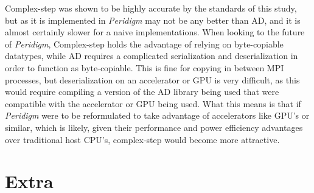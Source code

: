 \documentclass[preprint,12pt]{elsarticle}
\begin{document}
Complex-step was shown to be highly accurate by the standards of this study, but as it is
implemented in \emph{Peridigm} may not be any better than AD, and it is almost certainly slower for
a naive implementations. When looking to the future of \emph{Peridigm}, Complex-step holds the
advantage of relying on byte-copiable datatypes, while AD requires a complicated serialization and
deserialization in order to function as byte-copiable. This is fine for copying in between MPI
processes, but deserialization on an accelerator or GPU is very difficult, as this would require
compiling a version of the AD library being used that were compatible with the accelerator or GPU
being used. What this means is that if \emph{Peridigm} were to be reformulated to take advantage of
accelerators like GPU's or similar, which is likely, given their performance and power efficiency
advantages over traditional host CPU's, complex-step would become more attractive.



\appendix

\section{Extra}
\label{}






\end{document}
